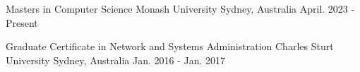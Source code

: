 

\begin{cventries}

  \cventry
    {Masters in Computer Science} %
    {Monash University} %
    {Sydney, Australia} %
    {April. 2023 - Present} %
   {
      \begin{cvitems} %
      \end{cvitems}
    }


  \cventry
    {Graduate Certificate in Network and Systems Administration} %
    {Charles Sturt University} %
    {Sydney, Australia} %
    {Jan. 2016 - Jan. 2017} %
   {
      \begin{cvitems} %
      \end{cvitems}
    }

\end{cventries}
